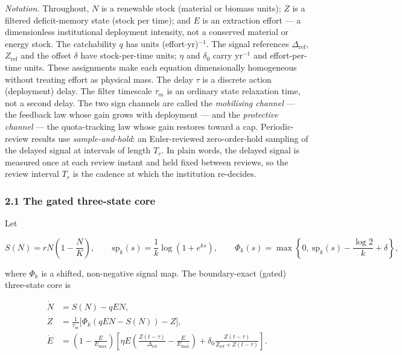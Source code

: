 \documentclass[11pt]{article}
\begin{document}
\emph{Notation.} Throughout, \(N\) is a renewable stock (material or
biomass units); \(Z\) is a filtered deficit-memory state (stock per
time); and \(E\) is an extraction effort --- a dimensionless
institutional deployment intensity, not a conserved material or energy
stock. The catchability \(q\) has units (effort\ensuremath{\cdot}yr)\(^{-1}\). The signal
references \(\Delta_{\mathrm{ref}}\), \(Z_{\mathrm{ref}}\) and the
offset \(\delta\) have stock-per-time units; \(\eta\) and \(\delta_0\)
carry yr\(^{-1}\) and effort-per-time units. These assignments make each
equation dimensionally homogeneous without treating effort as physical
mass. The delay \(\tau\) is a discrete action (deployment) delay. The
filter timescale \(\tau_m\) is an ordinary state relaxation time, not a
second delay. The two sign channels are called the \emph{mobilising
channel} --- the feedback law whose gain grows with deployment --- and
the \emph{protective channel} --- the quota-tracking law whose gain
restores toward a cap. Periodic-review results use
\emph{sample-and-hold}: an Euler-reviewed zero-order-hold sampling of
the delayed signal at intervals of length \(T_r\). In plain words, the
delayed signal is measured once at each review instant and held fixed
between reviews, so the review interval \(T_r\) is the cadence at which
the institution re-decides.

\subsubsection{2.1 The gated three-state
core}\label{the-gated-three-state-core}

Let

\[S(N) = rN\left(1 - \frac{N}{K}\right), \qquad \mathrm{sp}_k(s) = \frac{1}{k}\log(1 + e^{ks}), \qquad \Phi_k(s) = \max\left\{0,\ \mathrm{sp}_k(s) - \frac{\log 2}{k} + \delta\right\},\]

where \(\Phi_k\) is a shifted, non-negative signal map. The
boundary-exact (gated) three-state core is

\[\begin{aligned}
\dot N &= S(N) - qEN, \\
\dot Z &= \frac{1}{\tau_m}\bigl[\Phi_k(qEN - S(N)) - Z\bigr], \\
\dot E &= \left(1 - \frac{E}{E_{\max}}\right)\left[\eta E\left(\frac{Z(t-\tau)}{\Delta_{\mathrm{ref}}} - \frac{E}{E_{\max}}\right) + \delta_0\frac{Z(t-\tau)}{Z_{\mathrm{ref}} + Z(t-\tau)}\right].
\end{aligned} \tag{1}\]
\end{document}
